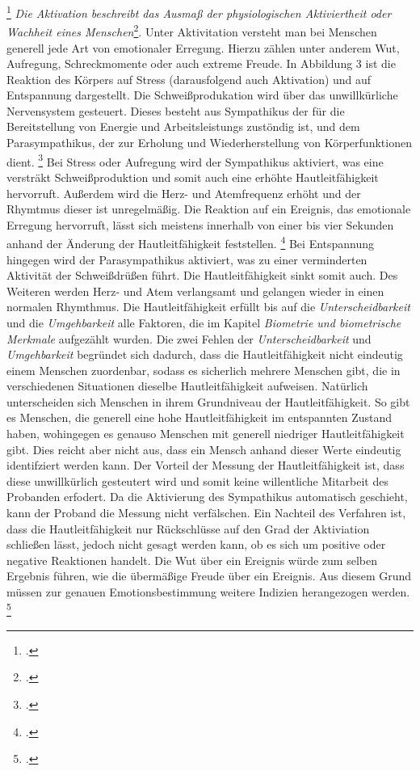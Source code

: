 \footcitetext[][S. 200]{Dil13}
\newline
\glqq \textit{Die Aktivation beschreibt das Ausmaß der physiologischen Aktiviertheit oder Wachheit eines Menschen}\grqq{}\footcite[][S. 28]{Die06}. Unter Aktivitation versteht man bei Menschen generell jede Art von emotionaler Erregung. Hierzu zählen unter anderem Wut, Aufregung, Schreckmomente oder auch extreme Freude. In Abbildung 3 ist die Reaktion des Körpers auf Stress (darausfolgend auch Aktivation) und auf Entspannung dargestellt. Die Schweißprodukation wird über das unwillkürliche Nervensystem gesteuert. Dieses besteht aus Sympathikus der für die Bereitstellung von Energie und Arbeitsleistungs zustöndig ist, und dem Parasympathikus, der zur Erholung und Wiederherstellung von Körperfunktionen dient. \footcite[Vgl. ][S. 5]{Lie13} \newline Bei Stress oder Aufregung wird der Sympathikus aktiviert, was eine versträkt Schweißproduktion und somit auch eine erhöhte Hautleitfähigkeit hervorruft. Außerdem wird die Herz- und Atemfrequenz erhöht und der Rhymtmus dieser ist unregelmäßig. Die Reaktion auf ein Ereignis, das emotionale Erregung hervorruft, lässt sich meistens innerhalb von einer bis vier Sekunden anhand der Änderung der Hautleitfähigkeit feststellen. \footcite[Vgl.][S. 130f]{Sch14} \newline 
Bei Entspannung hingegen wird der Parasympathikus aktiviert, was zu einer verminderten Aktivität der Schweißdrüßen führt. Die Hautleitfähigkeit sinkt somit auch. Des Weiteren werden Herz- und Atem verlangsamt und gelangen wieder in einen normalen Rhymthmus. \newline
Die Hautleitfähigkeit erfüllt bis auf die \textit{Unterscheidbarkeit} und die \textit{Umgehbarkeit} alle Faktoren, die im Kapitel \textit{Biometrie und biometrische Merkmale} aufgezählt wurden. Die zwei Fehlen der \textit{Unterscheidbarkeit} und \textit{Umgehbarkeit} begründet sich dadurch, dass die Hautleitfähigkeit nicht eindeutig einem Menschen zuordenbar, sodass es sicherlich mehrere Menschen gibt, die in verschiedenen Situationen dieselbe Hautleitfähigkeit aufweisen. Natürlich unterscheiden sich Menschen in ihrem Grundniveau der Hautleitfähigkeit. So gibt es Menschen, die generell eine hohe Hautleitfähigkeit im entspannten Zustand haben, wohingegen es genauso Menschen mit generell niedriger Hautleitfähigkeit gibt. Dies reicht aber nicht aus, dass ein Mensch anhand dieser Werte eindeutig identifziert werden kann. \newline
Der Vorteil der Messung der Hautleitfähigkeit ist, dass diese unwillkürlich gesteutert wird und somit keine willentliche Mitarbeit des Probanden erfodert. Da die Aktivierung des Sympathikus automatisch geschieht, kann der Proband die Messung nicht verfälschen. \newline
Ein Nachteil des Verfahren ist, dass die Hautleitfähigkeit nur Rückschlüsse auf den Grad der Aktiviation schließen lässt, jedoch nicht gesagt werden kann, ob es sich um positive oder negative Reaktionen handelt. Die Wut über ein Ereignis würde zum selben Ergebnis führen, wie die übermäßige Freude über ein Ereignis. Aus diesem Grund müssen zur genauen Emotionsbestimmung weitere Indizien herangezogen werden. \footcite[Vgl. ][S.77]{Moe07}
